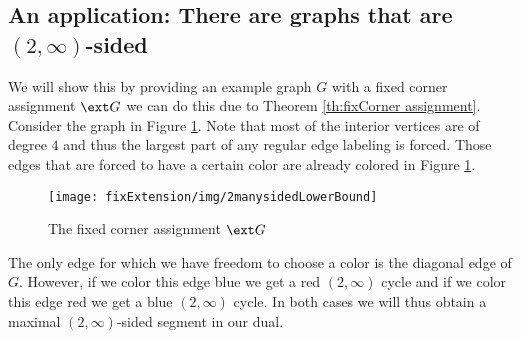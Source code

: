 \subsection{An application: There are graphs that are $(2, \infty)$-sided}

  We will show this by providing an example graph $G$ with a fixed corner assignment $\ext G$ we can do this due to Theorem \ref{th:fixCorner assignment}. Consider the graph in Figure \ref{fig:2manysidedLowerBound}. Note that most of the interior vertices are of degree $4$ and thus the largest part of any regular edge labeling is forced. Those edges that are forced to have a certain color are already colored in Figure \ref{fig:2manysidedLowerBound}.


  \begin{figure}[h!]
  \centering
  \texttt{[image: fixExtension/img/2manysidedLowerBound]}

  \caption{The fixed corner assignment $\ext G$
      \label{fig:2manysidedLowerBound}}
  \end{figure}

  The only edge for which we have freedom to choose a color is the diagonal edge of $G$. However, if we color this edge blue we get a red $(2, \infty)$ cycle and if we color this edge red we get a blue $(2, \infty)$ cycle. In both cases we will thus obtain a maximal $(2,\infty)$-sided segment in our dual.
